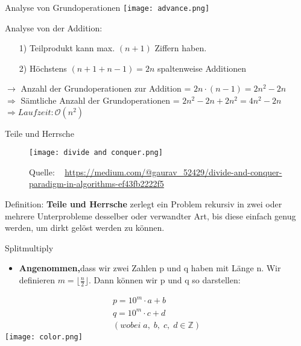 \documentclass{beamer}
\begin{document}
\begin{frame}{Analyse von Grundoperationen}
\texttt{[image: advance.png]}
\begin{block}{Analyse von der Addition:}
\begin{itemize}
    \item[1)] Teilprodukt kann max. $(n + 1)$ Ziffern haben. 
    \item[2)] Höchstens $(n + 1 + n - 1) = 2n$ spaltenweise Additionen 
\end{itemize}
$\rightarrow$ Anzahl der Grundoperationen zur Addition = $2n \cdot (n - 1) = 2n^2 - 2n$\\
$\Rightarrow$ Sämtliche Anzahl der Grundoperationen = $2n^2 - 2n + 2n^2 = 4n^2 - 2n$
$\Rightarrow Laufzeit: \mathcal{O}(n^2)$
\end{block}
    
\end{frame}

\begin{frame}{Teile und Herrsche}
\begin{figure}[!ht]  
    \centering  
    \texttt{[image: divide and conquer.png]}
    \caption{\footnotesize Quelle: \  \textcolor{blue}{ \href{https://medium.com/@gaurav_52429/divide-and-conquer-paradigm-in-algorithms-ef43fb2222f5}{https://medium.com/@gaurav\_52429/divide-and-conquer-paradigm-in-algorithms-ef43fb2222f5}}}  
\end{figure} 
\begin{block}{Definition: }
\textbf{Teile und Herrsche} zerlegt ein Problem rekursiv in zwei oder mehrere Unterprobleme desselber oder verwandter Art, bis diese einfach genug werden, um dirkt gelöst werden zu können. 
\end{block}
\end{frame}



\begin{frame}{Splitmultiply}
\begin{itemize}
    \item \textbf{Angenommen,}dass wir zwei Zahlen p und q haben mit Länge n. Wir definieren $m = \lfloor \frac{n}{2} \rfloor$. Dann können wir p und q so darstellen:
\end{itemize}
    \begin{align*}
        p = 10^{m} \cdot a + b\\
        q = 10^{m} \cdot c + d\\
        (wobei \;a, \;b, \;c, \;d \in \mathbb{Z})
    \end{align*}    
    \texttt{[image: color.png]}
\end{frame}
\end{document}
